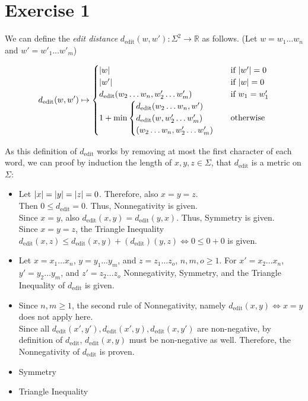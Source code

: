 \documentclass[12pt]{article}
\DeclarePairedDelimiter\abs{\lvert}{\rvert}
\begin{document}
\section*{Exercise 1}
We can define the \textit{edit distance} $d_{\text{edit}}(w,w'): \Sigma^2 \rightarrow \mathbb{R}$ as follows. (Let $w=w_1 \dots w_n$ and $w'=w'_1 \dots w'_m$)

\begin{equation*}
	d_{\text{edit}}(w,w') \mapsto
	\begin{cases}
		\abs{w} & \text{if } \abs{w'}=0 \\
		\abs{w'} & \text{if } \abs{w}=0 \\
		d_{\text{edit}}(w_2 \dots w_n, w'_2 \dots w'_m) & \text{if } w_1 = w'_1 \\
		1 + \min
			\begin {cases}
				d_{\text{edit}}(w_2 \dots w_n, w') \\
				d_{\text{edit}}(w, w'_2 \dots w'_m) \\
				(w_2 \dots w_n, w'_2 \dots w'_m)
			\end{cases}
			& \text{otherwise}
	\end{cases}
\end{equation*}

As this definition of $d_{\text{edit}}$ works by removing at most the first character of each word, we can proof by induction the length of $x,y,z \in \Sigma$, that $d_{\text{edit}}$ is a metric on $\Sigma$:
\begin{itemize}
	\item	Let $\abs{x}=\abs{y}=\abs{z}=0$. Therefore, also $x=y=z$. \\
			Then $0 \leq d_{\text{edit}} = 0$. Thus, Nonnegativity is given. \\
			Since $x=y$, also $d_{\text{edit}}(x,y) = d_{\text{edit}}(y,x)$. Thus, Symmetry is given. \\
			Since $x=y=z$, the Triangle Inequality $d_{\text{edit}}(x,z) \leq d_{\text{edit}}(x,y) + (d_{\text{edit}})(y,z) \Leftrightarrow 0 \leq 0 + 0$ is given.
	\item 	Let $x=x_1 \dots x_n$, $y=y_1 \dots y_m$, and $z=z_1 \dots z_o$, $n,m,o \geq 1$. For $x'=x_2 \dots x_n$, $y'=y_2 \dots y_m$, and $z'=z_2 \dots z_o$ Nonnegativity, Symmetry, and the Triangle Inequality of $d_{\text{edit}}$ is given.
	\item	Since $n,m \geq 1$, the second rule of Nonnegativity, namely $d_{\text{edit}}(x,y) \Leftrightarrow x=y$ does not apply here. \\
			Since all $d_{\text{edit}}(x',y'), d_{\text{edit}}(x',y), d_{\text{edit}}(x,y')$ are non-negative, by definition of $d_{\text{edit}}$, $d_{\text{edit}}(x,y)$ must be non-negative as well. Therefore, the Nonnegativity of $d_{\text{edit}}$ is proven.
	\item	Symmetry
	\item	Triangle Inequality
\end{itemize}
\end{document}
